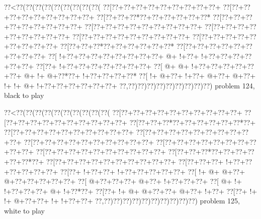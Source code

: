 \vbox{\vbox{\goo
\0??<\0??(\0??(\0??(\0??(\0??(\0??(\0??(\0??(\0??(
\0??[\0??+\0??+\0??+\0??+\0??+\0??+\0??+\0??+\0??+
\0??[\0??+\0??+\0??+\0??+\0??+\0??+\0??+\0??+\0??+
\0??[\0??+\0??+\0??*\0??+\0??+\0??+\0??+\0??+\0??*
\0??[\0??+\0??+\0??+\0??+\0??+\0??+\0??+\0??+\0??+
\0??[\0??+\0??+\0??+\0??+\0??+\0??+\0??+\0??+\0??+
\0??[\0??+\0??+\0??+\0??+\0??+\0??+\0??+\0??+\0??+
\0??[\0??+\0??+\0??+\0??+\0??+\0??+\0??+\0??+\0??+
\0??[\0??+\0??+\0??+\0??+\0??+\0??+\0??+\0??+\0??+
\0??[\0??+\0??+\0??*\0??+\0??+\0??+\0??+\0??+\0??*
\0??[\0??+\0??+\0??+\0??+\0??+\0??+\0??+\0??+\0??+
\0??[\- !+\0??+\0??+\0??+\0??+\0??+\0??+\0??+\0??+
\- @+\- !+\0??+\- !+\0??+\0??+\0??+\0??+\0??+\0??+
\0??[\0??+\- !+\0??+\0??+\0??+\0??+\0??+\0??+\0??+
\0??[\- @+\- @+\- !+\0??+\0??+\0??+\0??+\0??+\0??+
\- @+\- !+\- @+\0??*\0??+\- !+\0??+\0??+\0??+\0??*
\0??[\- !+\- @+\0??+\- !+\0??+\- @+\0??+\- @+\0??+
\- !+\- !+\- @+\- !+\0??+\0??+\0??+\0??+\0??+\0??+
\0??,\0??)\0??)\0??)\0??)\0??)\0??)\0??)\0??)\0??)
}
\hfil problem 124, black to play\hfil\break
}

\vbox{\vbox{\goo
\0??<\0??(\0??(\0??(\0??(\0??(\0??(\0??(\0??(\0??(\0??(
\0??[\0??+\0??+\0??+\0??+\0??+\0??+\0??+\0??+\0??+\0??+
\0??[\0??+\0??+\0??+\0??+\0??+\0??+\0??+\0??+\0??+\0??+
\0??[\0??+\0??+\0??*\0??+\0??+\0??+\0??+\0??+\0??*\0??+
\0??[\0??+\0??+\0??+\0??+\0??+\0??+\0??+\0??+\0??+\0??+
\0??[\0??+\0??+\0??+\0??+\0??+\0??+\0??+\0??+\0??+\0??+
\0??[\0??+\0??+\0??+\0??+\0??+\0??+\0??+\0??+\0??+\0??+
\0??[\0??+\0??+\0??+\0??+\0??+\0??+\0??+\0??+\0??+\0??+
\0??[\0??+\0??+\0??+\0??+\0??+\0??+\0??+\0??+\0??+\0??+
\0??[\0??+\0??+\0??*\0??+\0??+\0??+\0??+\0??+\0??*\0??+
\0??[\0??+\0??+\0??+\0??+\0??+\0??+\0??+\0??+\0??+\0??+
\0??[\0??+\0??+\0??+\- !+\0??+\0??+\0??+\0??+\0??+\0??+
\0??[\0??+\- !+\0??+\0??+\- !+\0??+\0??+\0??+\0??+\0??+
\0??[\- !+\- @+\- @+\0??+\- @+\0??+\0??+\0??+\0??+\0??+
\0??[\- @+\0??+\0??+\0??+\- @+\0??+\- !+\0??+\0??+\0??+
\0??[\- @+\- !+\- !+\0??+\0??+\0??+\- @+\- !+\0??*\0??+
\0??[\0??+\- !+\- @+\- @+\0??+\0??+\- @+\0??+\- !+\0??+
\0??[\0??+\- !+\- !+\- @+\0??+\0??+\- !+\- !+\0??+\0??+
\0??,\0??)\0??)\0??)\0??)\0??)\0??)\0??)\0??)\0??)\0??)
}
\hfil problem 125, white to play\hfil\break
}

